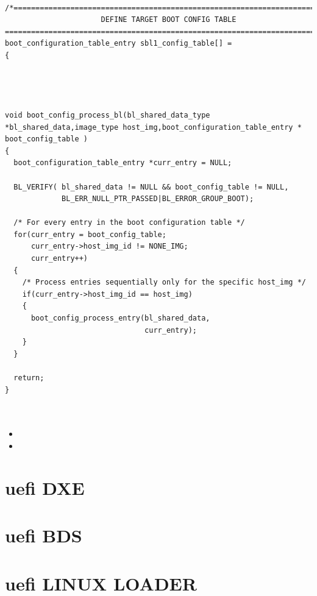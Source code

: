 \begin{lstlisting}
 /*==========================================================================
                      DEFINE TARGET BOOT CONFIG TABLE
===========================================================================*/
boot_configuration_table_entry sbl1_config_table[] = 
{




void boot_config_process_bl(bl_shared_data_type *bl_shared_data,image_type host_img,boot_configuration_table_entry * boot_config_table )
{
  boot_configuration_table_entry *curr_entry = NULL;

  BL_VERIFY( bl_shared_data != NULL && boot_config_table != NULL,
             BL_ERR_NULL_PTR_PASSED|BL_ERROR_GROUP_BOOT);

  /* For every entry in the boot configuration table */
  for(curr_entry = boot_config_table;
      curr_entry->host_img_id != NONE_IMG;
      curr_entry++)
  {
    /* Process entries sequentially only for the specific host_img */
    if(curr_entry->host_img_id == host_img)
    {
      boot_config_process_entry(bl_shared_data,
                                curr_entry);
    }
  }
 
  return;
}

 
\end{lstlisting}









\begin{itemize}

\item 

\item 

\end{itemize}


\section{uefi DXE}


\section{uefi BDS}





\section{uefi LINUX LOADER}




